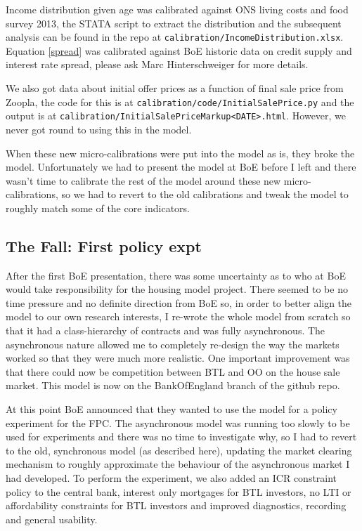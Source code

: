 \documentclass{report}
\begin{document}
Income distribution given age was calibrated against ONS living costs and food survey 2013, the STATA script to extract the distribution and the subsequent analysis can be found in the repo at \texttt{calibration/IncomeDistribution.xlsx}. Equation \ref{spread} was calibrated against BoE historic data on credit supply and interest rate spread, please ask Marc Hinterschweiger for more details.

We also got data about initial offer prices as a function of final sale price from Zoopla, the code for this is at \texttt{calibration/code/InitialSalePrice.py} and the output is at \texttt{calibration/InitialSalePriceMarkup<DATE>.html}. However, we never got round to using this in the model.

When these new micro-calibrations were put into the model as is, they broke the model. Unfortunately we had to present the model at BoE before I left and there wasn't time to calibrate the rest of the model around these new micro-calibrations, so we had to revert to the old calibrations and tweak the model to roughly match some of the core indicators.

\subsection{The Fall: First policy expt}

After the first BoE presentation, there was some uncertainty as to who at BoE would take responsibility for the housing model project. There seemed to be no time pressure and no definite direction from BoE so, in order to better align the model to our own research interests, I re-wrote the whole model from scratch so that it had a class-hierarchy of contracts and was fully asynchronous. The asynchronous nature allowed me to completely re-design the way the markets worked so that they were much more realistic. One important improvement was that there could now be competition between BTL and OO on the house sale market. This model is now on the BankOfEngland branch of the github repo.

At this point BoE announced that they wanted to use the model for a policy experiment for the FPC. The asynchronous model was running too slowly to be used for experiments and there was no time to investigate why, so I had to revert to the old, synchronous model (as described here), updating the market clearing mechanism to roughly approximate the behaviour of the asynchronous market I had developed. To perform the experiment, we also added an ICR constraint policy to the central bank, interest only mortgages for BTL investors, no LTI or affordability constraints for BTL investors and improved diagnostics, recording and general usability.
\end{document}
